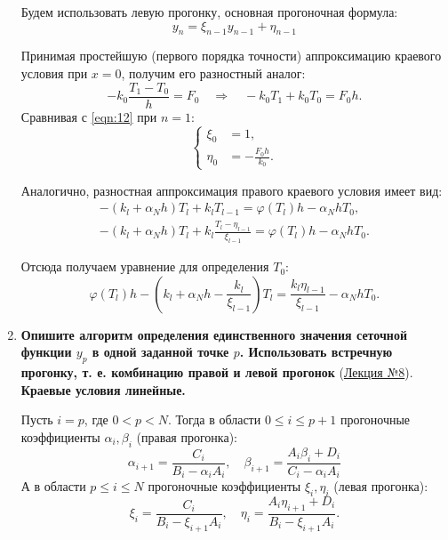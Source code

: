\documentclass[a4paper,oneside,12pt]{extreport}
\begin{document}
\begin{enumerate}
	Будем использовать левую прогонку, основная прогоночная формула:
	\begin{equation}
		y_n = \xi_{n-1} y_{n-1} + \eta_{n-1}
		\label{eqn:12}
	\end{equation}

	Принимая простейшую (первого порядка точности) аппроксимацию краевого условия при $x=0$, получим его разностный аналог:
	\begin{equation}
		-k_0\frac{T_1-T_0}h=F_0 \quad\Rightarrow\quad -k_0T_1+k_0T_0=F_0h.
	\end{equation}
	Сравнивая с \eqref{eqn:12} при $n=1$:
	\begin{equation}
		\left\{
		\begin{aligned}
			\xi_0 &= 1,\\
			\eta_0 &= -\frac{F_0h}{k_0}.
		\end{aligned}
		\right.
	\end{equation}

	Аналогично, разностная аппроксимация правого краевого условия имеет вид:
	\begin{gather}
		-(k_l+\alpha_Nh)T_l+k_lT_{l-1}=\varphi(T_l)h-\alpha_NhT_0,\\
		-(k_l+\alpha_Nh)T_l+k_l\frac{T_l-\eta_{l-1}}{\xi_{l-1}}=\varphi(T_l)h-\alpha_NhT_0.
	\end{gather}

	Отсюда получаем уравнение для определения $T_0$:
	\begin{equation}
		\varphi(T_l)h - \left(k_l+\alpha_Nh-\frac{k_l}{\xi_{l-1}}\right)T_l = \frac{k_l\eta_{l-1}}{\xi_{l-1}}-\alpha_NhT_0.
	\end{equation}


	\item \textbf{Опишите алгоритм определения единственного значения сеточной функции $y_p$ в одной заданной точке $p$.
	Использовать встречную прогонку, т. е. комбинацию правой и левой прогонок} (\href{ftp://eufs.bmstu.ru/19426610-bd1a-11e6-93f1-005056960017/30-03-2020-%D0%9B%D0%B5%D0%BA%D1%86%D0%B8%D1%8F_%E2%84%968_%D0%9C%D0%BE%D0%B4%D0%B5%D0%BB%D0%B8_%D0%9E%D0%94%D0%A3_%D0%BA%D1%80%D0%B0%D0%B5%D0%B2%D0%B0%D1%8F_%D0%B7%D0%B0%D0%B4%D0%B0%D1%87%D0%B0.pdf}{Лекция №8}).
	\textbf{Краевые условия линейные.}

	Пусть $i=p$, где $0<p<N$.
	Тогда в области $0 \leqslant i \leqslant p+1$ прогоночные коэффициенты $\alpha_i, \beta_i$ (правая прогонка):
	\begin{equation}
		\alpha_{i+1}=\frac{C_i}{B_i-\alpha_iA_i},\quad \beta_{i+1}=\frac{A_i\beta_i+D_i}{C_i-\alpha_iA_i}
	\end{equation}
	А в области $p\leqslant i \leqslant N$ прогоночные коэффициенты $\xi_i, \eta_i$ (левая прогонка):
	\begin{equation}
		\xi_{i}=\frac{C_i}{B_i-\xi_{i+1}A_i},\quad \eta_{i}=\frac{A_i\eta_{i+1}+D_i}{B_i-\xi_{i+1}A_i}.
	\end{equation}


\end{enumerate}
\end{document}
